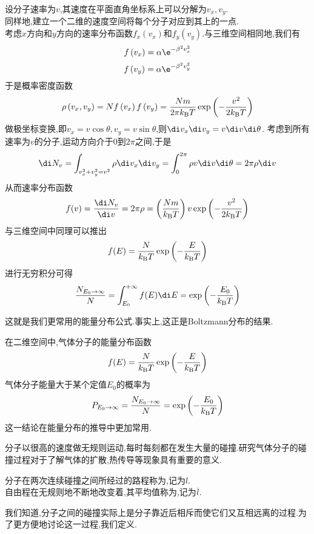 \documentclass{ctexart}
\begin{document}
\begin{derivation}
    设分子速率为$v$,其速度在平面直角坐标系上可以分解为$v_x,v_y$.\\
    同样地,建立一个二维的速度空间将每个分子对应到其上的一点.\\
    考虑$x$方向和$y$方向的速率分布函数$f_x\left(v_x\right)$和$f_y\left(v_y\right)$.与三维空间相同地,我们有
    \[f\left(v_x\right)=\alpha\e^{-\beta^2v_x^2}\]
    \[f\left(v_y\right)=\alpha\e^{-\beta^2v_y^2}\]
    于是概率密度函数
    \[\rho\left(v_x,v_y\right)=Nf\left(v_x\right)f\left(v_y\right)
    =\dfrac{Nm}{2\pi k_\text B T}\exp\left(-\dfrac{v^2}{2k_\text BT}\right)\]
    做极坐标变换,即$v_x=v\cos\theta,v_y=v\sin\theta$,则$\di v_x\di v_y=v\di v\di\theta$.%
    考虑到所有速率为$v$的分子,运动方向介于$0$到$2\pi$之间,于是
    \[\di N_v=\int_{v_x^2+v_y^2=v^2}\rho\di v_x\di v_y=\int_{0}^{2\pi}\rho v\di v\di \theta=2\pi\rho\di v\]
    从而速率分布函数
    \[f(v)=\dfrac{\di N_v}{\di v}=2\pi\rho=\left(\dfrac{Nm}{k_\text BT}\right)v\exp\left(-\dfrac{v^2}{2k_\text BT}\right)\]
    与三维空间中同理可以推出
    \[f(E)=\dfrac{N}{k_\text BT}\exp\left(-\dfrac{E}{k_\text BT}\right)\]
    进行无穷积分可得
    \[\dfrac{N_{E_0\to\infty}}{N}=\int_{E_0}^{+\infty}f(E)\di E=\exp\left(-\dfrac{E_0}{k_\text BT}\right)\]
    
\end{derivation}
这就是我们更常用的能量分布公式.事实上,这正是Boltzmann分布的结果.
\begin{theorem}[1B.3.3 能量分布的近似公式]
    在二维空间中,气体分子的能量分布函数
    \[f(E)=\dfrac{N}{k_\text BT}\exp\left(-\dfrac{E}{k_\text BT}\right)\]
    气体分子能量大于某个定值$E_0$的概率为
    \[P_{E_0\to\infty}=\dfrac{N_{E_0\to\infty}}{N}=\exp\left(-\dfrac{E_0}{k_\text BT}\right)\]
    这一结论在能量分布的推导中更加常用.
\end{theorem}
\vspace{8pt}
\indent 分子以很高的速度做无规则运动,每时每刻都在发生大量的碰撞.研究气体分子的碰撞过程对于了解气体的扩散,热传导等现象具有重要的意义.
\begin{definition}[1B.4.1 自由程与平均自由程]
    分子在两次连续碰撞之间所经过的路程称为,记为$l$.\\
    自由程在无规则地不断地改变着,其平均值称为,记为$\overline{l}$.
\end{definition}
我们知道,分子之间的碰撞实际上是分子靠近后相斥而使它们又互相远离的过程.为了更方便地讨论这一过程,我们定义.
\end{document}
